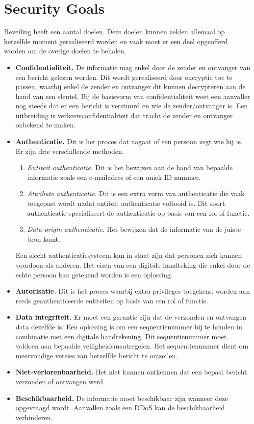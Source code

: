 \documentclass{report}
\begin{document}
	\section{Security Goals}
	Beveiling heeft een aantal doelen. Deze doelen kunnen zelden allemaal op hetzelfde moment gerealiseerd worden en vaak moet er een deel opgeofferd worden om de overige doelen te behalen.
	\begin{itemize}
		\item \textbf{Confidentialiteit.} De informatie mag enkel door de zender en ontvanger van een bericht gelezen worden. Dit wordt gerealiseerd door encryptie toe te passen, waarbij enkel de zender en ontvanger dit kunnen decrypteren aan de hand van een sleutel. Bij de basisvorm van confidentialiteit weet een aanvaller nog steeds dat er een bericht is verstuurd en wie de zender/ontvanger is. Een uitbreiding is verkeersconfidentialiteit dat tracht de zender en ontvanger onbekend te maken.
		\item \textbf{Authenticatie.} Dit is het proces dat nagaat of een persoon zegt wie hij is. Er zijn drie verschillende methoden.
		\begin{enumerate}
			\item \textit{Entiteit authenticatie.} Dit is het bewijzen aan de hand van bepaalde informatie zoals een e-mailadres of een uniek ID nummer.
			\item \textit{Attribute authenticatie.} Dit is een extra vorm van authenticatie die vaak toegepast wordt nadat entiteit authenticatie voltooid is. Dit soort authenticatie specialiseert de authenticatie op basis van een rol of functie.
			\item \textit{Data-origin authenticatie.} Het bewijzen dat de informatie van de juiste bron komt. 
		\end{enumerate}
	    Een slecht authenticatiesysteem kan in staat zijn dat personen zich kunnen voordoen als anderen. Het eisen van een digitale handteking die enkel door de echte persoon kan getekend worden is een oplossing.
		\item \textbf{Autorisatie.} Dit is het proces waarbij extra privileges toegekend worden aan reeds geauthenticeerde entiteiten op basis van een rol of functie.
		\item \textbf{Data integriteit.} Er moet een garantie zijn dat de verzonden en ontvangen data dezelfde is. Een oplossing is om een sequentienummer bij te houden in combinatie met een digitale handtekening. Dit sequentienummer moet voldoen aan bepaalde veiligheidsmaatregelen. Het sequentienummer dient om meervoudige versies van hetzelfde bericht te omzeilen.
		
		\item \textbf{Niet-verlorenbaarheid.} Het niet kunnen ontkennen dat een bepaal bericht verzonden of ontvangen werd. 
		
		\item \textbf{Beschikbaarheid.} De informatie moet beschikbaar zijn wanneer deze opgevraagd wordt. Aanvallen zoals een DDoS kan de beschikbaarheid verhinderen.
	\end{itemize}
\end{document}
